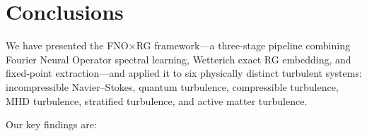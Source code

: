 \section{Conclusions\label{sec:conclusions}}

We have presented the FNO$\times$RG framework---a three-stage pipeline combining Fourier Neural Operator spectral learning, Wetterich exact RG embedding, and fixed-point extraction---and applied it to six physically distinct turbulent systems: incompressible Navier--Stokes, quantum turbulence, compressible turbulence, MHD turbulence, stratified turbulence, and active matter turbulence.

Our key findings are:

